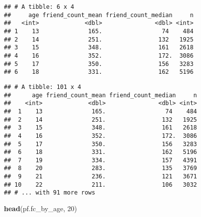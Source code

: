 \documentclass[]{article}
\newenvironment{Shaded}{\begin{snugshade}}{\end{snugshade}}
\newcommand{\KeywordTok}[1]{\textcolor[rgb]{0.13,0.29,0.53}{\textbf{#1}}}
\newcommand{\DataTypeTok}[1]{\textcolor[rgb]{0.13,0.29,0.53}{#1}}
\newcommand{\DecValTok}[1]{\textcolor[rgb]{0.00,0.00,0.81}{#1}}
\newcommand{\StringTok}[1]{\textcolor[rgb]{0.31,0.60,0.02}{#1}}
\newcommand{\OperatorTok}[1]{\textcolor[rgb]{0.81,0.36,0.00}{\textbf{#1}}}
\newcommand{\NormalTok}[1]{#1}
\begin{document}
\begin{verbatim}
## # A tibble: 6 x 4
##     age friend_count_mean friend_count_median     n
##   <int>             <dbl>               <dbl> <int>
## 1    13              165.                 74    484
## 2    14              251.                132   1925
## 3    15              348.                161   2618
## 4    16              352.                172.  3086
## 5    17              350.                156   3283
## 6    18              331.                162   5196
\end{verbatim}

\begin{Shaded}
\end{Shaded}

\begin{verbatim}
## # A tibble: 101 x 4
##      age friend_count_mean friend_count_median     n
##    <int>             <dbl>               <dbl> <int>
##  1    13              165.                 74    484
##  2    14              251.                132   1925
##  3    15              348.                161   2618
##  4    16              352.                172.  3086
##  5    17              350.                156   3283
##  6    18              331.                162   5196
##  7    19              334.                157   4391
##  8    20              283.                135   3769
##  9    21              236.                121   3671
## 10    22              211.                106   3032
## # ... with 91 more rows
\end{verbatim}

\begin{Shaded}
\begin{Highlighting}[]
\KeywordTok{head}\NormalTok{(pf.fc_by_age, }\DecValTok{20}\NormalTok{)}
\end{Highlighting}
\end{Shaded}
\end{document}

